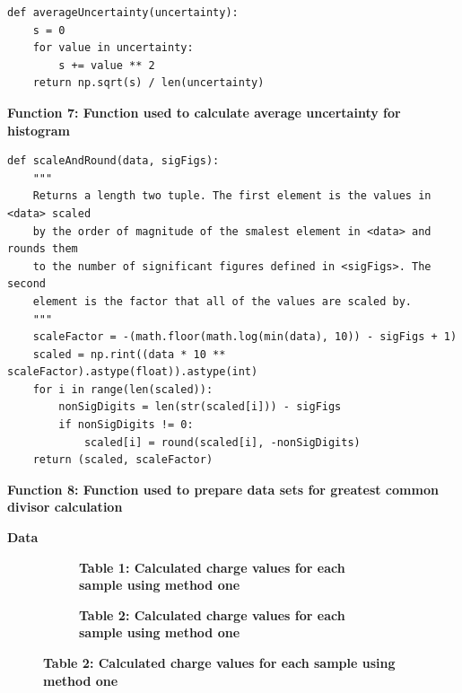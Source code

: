 \documentclass[
	letterpaper, %
	10pt, %
]{CSUniSchoolLabReport}
\begin{document}
\begin{verbatim}
def averageUncertainty(uncertainty):
    s = 0
    for value in uncertainty:
        s += value ** 2
    return np.sqrt(s) / len(uncertainty)
\end{verbatim}
\begin{center}
    \textbf{Function 7: Function used to calculate average uncertainty for histogram}
\end{center}
\newpage
\begin{verbatim}
def scaleAndRound(data, sigFigs):
    """
    Returns a length two tuple. The first element is the values in <data> scaled
    by the order of magnitude of the smalest element in <data> and rounds them
    to the number of significant figures defined in <sigFigs>. The second
    element is the factor that all of the values are scaled by.
    """
    scaleFactor = -(math.floor(math.log(min(data), 10)) - sigFigs + 1)
    scaled = np.rint((data * 10 ** scaleFactor).astype(float)).astype(int)
    for i in range(len(scaled)):
        nonSigDigits = len(str(scaled[i])) - sigFigs
        if nonSigDigits != 0:
            scaled[i] = round(scaled[i], -nonSigDigits)
    return (scaled, scaleFactor)
\end{verbatim}
\begin{center}
\textbf{Function 8: Function used to prepare data sets for greatest common divisor calculation}
\end{center}
\newpage
{\Large\textbf{Data}}
\begin{figure}[H]
	\centering
	\begin{subfigure}{0.45\textwidth}
        
		\caption{\textbf{Table 1: Calculated charge values for each sample using method one }}
	\end{subfigure}
    \hfill
    \begin{subfigure}{0.45\textwidth}
        
		\caption{\textbf{Table 2: Calculated charge values for each sample using method one }}
	\end{subfigure}
\end{figure}
\end{document}
